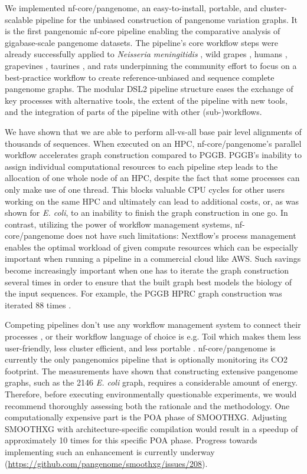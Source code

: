 \documentclass{bioinfo}
\theoremstyle{definition}
\begin{document}
	We implemented nf-core/pangenome, an easy-to-install, portable, and cluster-scalable pipeline for the unbiased construction of pangenome variation graphs. 
	It is the first pangenomic nf-core pipeline enabling the comparative analysis of gigabase-scale pangenome datasets. 
	The pipeline’s core workflow steps were already successfully applied to \textit{Neisseria meningitidis} \citep{Yang2023}, wild grapes \citep{Cochetel2023}, humans \citep{Guarracino2023, Liao2023}, grapevines \citep{Guo2024}, taurines \citep{Milia2024}, and rats \citep{Villani2024} underpinning the community effort to focus on a best-practice workflow to create reference-unbiased and sequence complete pangenome graphs. 
	The modular DSL2 pipeline structure eases the exchange of key processes with alternative tools, the extent of the pipeline with new tools, and the integration of parts of the pipeline with other (sub-)workflows.
	
	We have shown that we are able to perform all-vs-all base pair level alignments of thousands of sequences. 
	When executed on an HPC, nf-core/pangenome’s parallel workflow accelerates graph construction compared to PGGB. 
	PGGB’s inability to assign individual computational resources to each pipeline step leads to the allocation of one whole node of an HPC, despite the fact that some processes can only make use of one thread. 
	This blocks valuable CPU cycles for other users working on the same HPC and ultimately can lead to additional costs, or, as was shown for \textit{E. coli}, to an inability to finish the graph construction in one go. 
	In contrast, utilizing the power of workflow management systems, nf-core/pangenome does not have such limitations: 
	Nextflow’s process management enables the optimal workload of given compute resources which can be especially important when running a pipeline in a commercial cloud like AWS. 
	Such savings become increasingly important when one has to iterate the graph construction several times in order to ensure that the built graph best models the biology of the input sequences. 
	For example, the PGGB HPRC graph construction was iterated 88 times \citep{Liao2023}.
	
	Competing pipelines don’t use any workflow management system to connect their processes \citep{Chin2023}, or their workflow language of choice is e.g. Toil \citep{Vivian2017, Hickey2023} which makes them less user-friendly, less cluster efficient, and less portable \citep{Wratten2021}.
	nf-core/pangenome is currently the only pangenomics pipeline that is optionally monitoring its CO2 footprint. 
	The measurements have shown that constructing extensive pangenome graphs, such as the 2146 \textit{E. coli} graph, requires a considerable amount of energy. 
	Therefore, before executing environmentally questionable experiments, we would recommend thoroughly assessing both the rationale and the methodology. 
	One computationally expensive part is the POA phase of SMOOTHXG. 
	Adjusting SMOOTHXG with architecture-specific compilation would result in a speedup of approximately 10 times for this specific POA phase. 
	Progress towards implementing such an enhancement is currently underway (\href{https://github.com/pangenome/smoothxg/issues/208}{https://github.com/pangenome/smoothxg/issues/208}).
	
\end{document}
